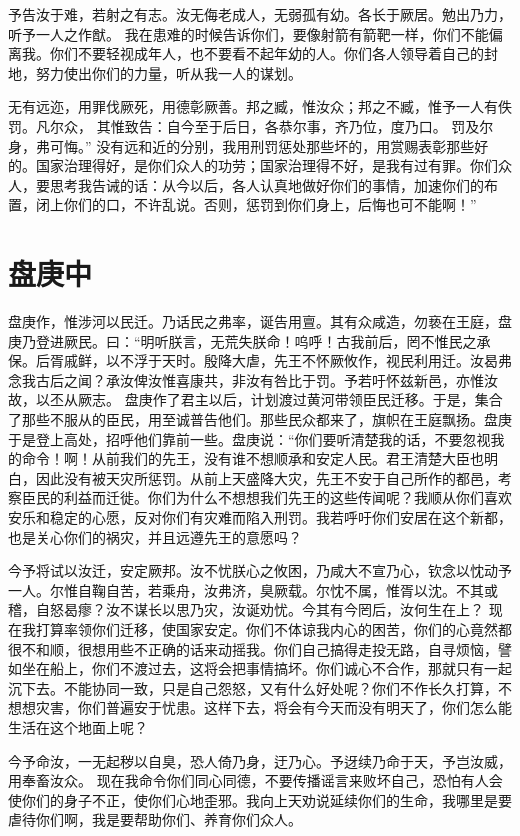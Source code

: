 \documentclass[a4paper,12pt,UTF8,twoside]{ctexbook}
\begin{document}
予告汝于难，若射之有志。汝无侮老成人，无弱孤有幼。各长于厥居。勉出乃力，听予一人之作猷。
我在患难的时候告诉你们，要像射箭有箭靶一样，你们不能偏离我。你们不要轻视成年人，也不要看不起年幼的人。你们各人领导着自己的封地，努力使出你们的力量，听从我一人的谋划。

无有远迩，用罪伐厥死，用德彰厥善。邦之臧，惟汝众；邦之不臧，惟予一人有佚罚。凡尔众， 其惟致告：自今至于后日，各恭尔事，齐乃位，度乃口。 罚及尔身，弗可悔。”
没有远和近的分别，我用刑罚惩处那些坏的，用赏赐表彰那些好的。国家治理得好，是你们众人的功劳；国家治理得不好，是我有过有罪。你们众人，要思考我告诫的话：从今以后，各人认真地做好你们的事情，加速你们的布置，闭上你们的口，不许乱说。否则，惩罚到你们身上，后悔也可不能啊！”

\chapter{盘庚中}

盘庚作，惟涉河以民迁。乃话民之弗率，诞告用亶。其有众咸造，勿亵在王庭，盘庚乃登进厥民。曰：“明听朕言，无荒失朕命！呜呼！古我前后，罔不惟民之承保。后胥戚鲜，以不浮于天时。殷降大虐，先王不怀厥攸作，视民利用迁。汝曷弗念我古后之闻？承汝俾汝惟喜康共，非汝有咎比于罚。予若吁怀兹新邑，亦惟汝故，以丕从厥志。
盘庚作了君主以后，计划渡过黄河带领臣民迁移。于是，集合了那些不服从的臣民，用至诚普告他们。那些民众都来了，旗帜在王庭飘扬。盘庚于是登上高处，招呼他们靠前一些。盘庚说：“你们要听清楚我的话，不要忽视我的命令！啊！从前我们的先王，没有谁不想顺承和安定人民。君王清楚大臣也明白，因此没有被天灾所惩罚。从前上天盛降大灾，先王不安于自己所作的都邑，考察臣民的利益而迁徙。你们为什么不想想我们先王的这些传闻呢？我顺从你们喜欢安乐和稳定的心愿，反对你们有灾难而陷入刑罚。我若呼吁你们安居在这个新都，也是关心你们的祸灾，并且远遵先王的意愿吗？

今予将试以汝迁，安定厥邦。汝不忧朕心之攸困，乃咸大不宣乃心，钦念以忱动予一人。尔惟自鞠自苦，若乘舟，汝弗济，臭厥载。尔忱不属，惟胥以沈。不其或稽，自怒曷瘳？汝不谋长以思乃灾，汝诞劝忧。今其有今罔后，汝何生在上？
现在我打算率领你们迁移，使国家安定。你们不体谅我内心的困苦，你们的心竟然都很不和顺，很想用些不正确的话来动摇我。你们自己搞得走投无路，自寻烦恼，譬如坐在船上，你们不渡过去，这将会把事情搞坏。你们诚心不合作，那就只有一起沉下去。不能协同一致，只是自己怨怒，又有什么好处呢？你们不作长久打算，不想想灾害，你们普遍安于忧患。这样下去，将会有今天而没有明天了，你们怎么能生活在这个地面上呢？

今予命汝，一无起秽以自臭，恐人倚乃身，迂乃心。予迓续乃命于天，予岂汝威，用奉畜汝众。
现在我命令你们同心同德，不要传播谣言来败坏自己，恐怕有人会使你们的身子不正，使你们心地歪邪。我向上天劝说延续你们的生命，我哪里是要虐待你们啊，我是要帮助你们、养育你们众人。
\end{document}
